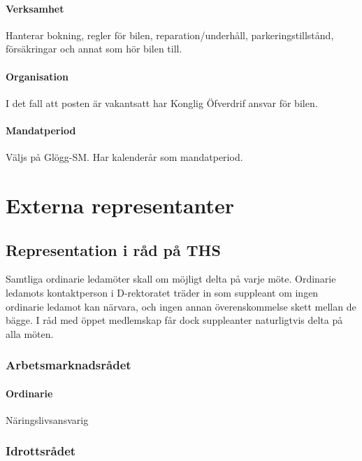 \documentclass{dgovdoc}
\begin{document}
\paragraph{Verksamhet}

Hanterar bokning, regler för bilen, reparation/underhåll, parkeringstillstånd,
försäkringar och annat som hör bilen till.

\paragraph{Organisation}

I det fall att posten är vakantsatt har Konglig Öfverdrif ansvar för bilen.

\paragraph{Mandatperiod}

Väljs på Glögg-SM. Har kalenderår som mandatperiod.

\section{Externa representanter}

\subsection{Representation i råd på THS}

Samtliga ordinarie ledamöter skall om möjligt delta på varje möte. Ordinarie
ledamots kontaktperson i D-rektoratet träder in som suppleant om ingen
ordinarie ledamot kan närvara, och ingen annan överenskommelse skett mellan de
bägge. I råd med öppet medlemskap får dock suppleanter naturligtvis delta på
alla möten.

\subsubsection{Arbetsmarknadsrådet}

\paragraph{Ordinarie}

Näringslivsansvarig

\subsubsection{Idrottsrådet}
\end{document}
